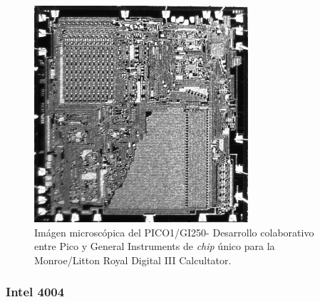 \begin{figure}
  \centering
  \includegraphics[scale=0.5]{./figures/C02-pico1_gi250}
  \captionsetup{justification=centering}
  \caption{Imágen microscópica del PICO1/GI250- Desarrollo colaborativo entre
    Pico y General Instruments de \emph{chip} único para la Monroe/Litton Royal 
    Digital III Calcultator.}
  \label{fig:C02-pico1_gi250}
\end{figure}

\subsubsection{Intel 4004}
\label{subsubsec:theory-history-microprocessor-4004}

